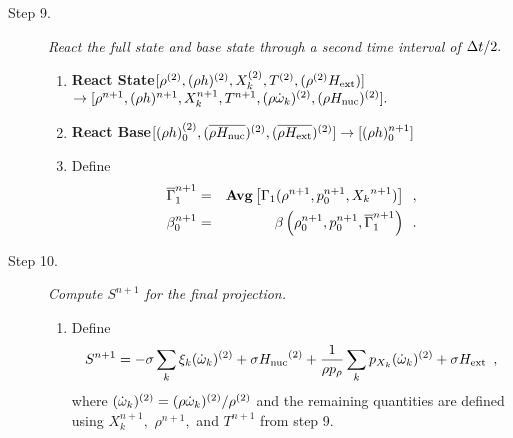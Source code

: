\begin{description}
\begin{enumerate}
\end{enumerate}

\item[Step 9.] {\em React the full state and base state through a second time 
interval of $\Delta t / 2.$}

\begin{enumerate}
\renewcommand{\theenumi}{{\bf \alph{enumi}}}

\item {\bf React State}$[\rho^{(2)},(\rho h)^{(2)}, X_k^{(2)},T^{(2)}, (\rho^{(2)} {H_{\rm ext}}) ]$\\
                   $\rightarrow [\rho^{n+1}, (\rho h)^{n+1}, X_k^{n+1}, T^{n+1}, 
                               (\rho \dot{\omega}_k)^{(2)}, (\rho {H_{\rm nuc}})^{(2)} ].$  

\item {\bf React Base}$[(\rho h)_0^{(2)},(\overline{\rho {H_{\rm nuc}}})^{(2)},(\overline{\rho{H_{\rm ext}}})^{(2)}] \rightarrow [(\rho h)_0^{n+1}]$

\item Define
\begin{eqnarray}
 \overline{\Gamma}_1^{n+1}    &=& {\rm{\bf Avg}}\left[\Gamma_1(\rho^{n+1}, p_0^{n+1}, {X_k}^{n+1}) \right] \enskip , \\ 
 {\beta   }_0^{n+1}    &=& \beta   \left(\rho_0^{n+1}, p_0^{n+1},   \overline{\Gamma}_1^{n+1}\right) \enskip .
\end{eqnarray}

\end{enumerate}

\item[Step 10.] {\em Compute $S^{n+1}$ for the final projection.}

\begin{enumerate}
\renewcommand{\theenumi}{{\bf \alph{enumi}}}
\item Define
\begin{equation}
  S^{n+1} =  -\sigma  \sum_k  \xi_k (\dot{\omega}_k)^{(2)}  + \sigma {H_{\rm nuc}}^{(2)} +
  \frac{1}{\rho p_\rho} \sum_k p_{X_k}  ({\dot{\omega}}_k)^{(2)}  
   + \sigma {H_{\rm ext}} \enskip ,
\end{equation}
where $(\dot{\omega}_k)^{(2)} = (\rho \dot{\omega}_k)^{(2)} / \rho^{(2)}$
and the remaining quantities are defined using $X_k^{n+1},$ $\rho^{n+1},$
and $T^{n+1}$ from step 9.


\end{enumerate}
\end{description}
